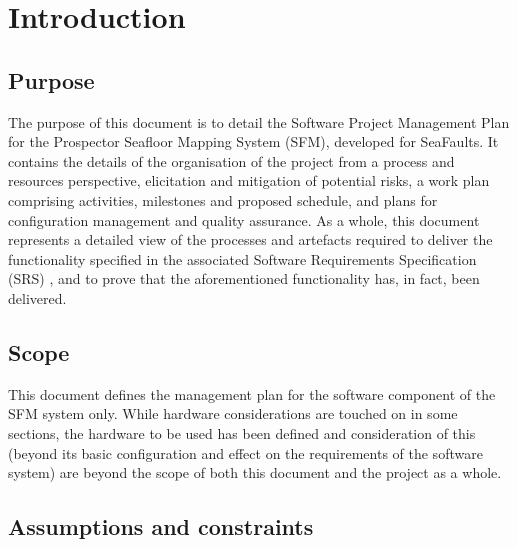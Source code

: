 \documentclass[12pt]{article}
\begin{document}
\clearpage 

\pagebreak
\tableofcontents
\pagebreak


\section{Introduction}

\subsection{Purpose}

The purpose of this document is to detail the Software Project Management Plan for the Prospector Seafloor Mapping System (SFM), developed for SeaFaults. It contains the details of the organisation of the project from a process and resources perspective, elicitation and mitigation of potential risks, a work plan comprising activities, milestones and proposed schedule, and plans for configuration management and quality assurance. As a whole, this document represents a detailed view of the processes and artefacts required to deliver the functionality specified in the associated Software Requirements Specification (SRS) \cite{srs}, and to prove that the aforementioned functionality has, in fact, been delivered.

\subsection{Scope}

This document defines the management plan for the software component
of the SFM system only. While hardware considerations are touched
on in some sections, the hardware to be
used has been defined and consideration of this (beyond its basic configuration and effect
on the requirements of the software system) are beyond the scope of
both this document and the project as a whole. 

\subsection{Assumptions and constraints}
\end{document}
